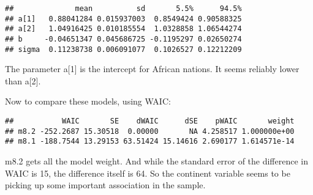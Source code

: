 \documentclass[
]{article}
\newenvironment{Shaded}{\begin{snugshade}}{\end{snugshade}}
\newcommand{\CommentTok}[1]{\textcolor[rgb]{0.56,0.35,0.01}{\textit{#1}}}
\newcommand{\DataTypeTok}[1]{\textcolor[rgb]{0.13,0.29,0.53}{#1}}
\newcommand{\DecValTok}[1]{\textcolor[rgb]{0.00,0.00,0.81}{#1}}
\newcommand{\FloatTok}[1]{\textcolor[rgb]{0.00,0.00,0.81}{#1}}
\newcommand{\KeywordTok}[1]{\textcolor[rgb]{0.13,0.29,0.53}{\textbf{#1}}}
\newcommand{\NormalTok}[1]{#1}
\newcommand{\OperatorTok}[1]{\textcolor[rgb]{0.81,0.36,0.00}{\textbf{#1}}}
\newcommand{\StringTok}[1]{\textcolor[rgb]{0.31,0.60,0.02}{#1}}
\begin{document}
\begin{Shaded}
\end{Shaded}

\begin{verbatim}
##              mean          sd       5.5%      94.5%
## a[1]   0.88041284 0.015937003  0.8549424 0.90588325
## a[2]   1.04916425 0.010185554  1.0328858 1.06544274
## b     -0.04651347 0.045686725 -0.1195297 0.02650274
## sigma  0.11238738 0.006091077  0.1026527 0.12212209
\end{verbatim}

The parameter a{[}1{]} is the intercept for African nations. It seems
reliably lower than a{[}2{]}.

Now to compare these models, using WAIC:

\begin{verbatim}
##           WAIC       SE    dWAIC      dSE    pWAIC       weight
## m8.2 -252.2687 15.30518  0.00000       NA 4.258517 1.000000e+00
## m8.1 -188.7544 13.29153 63.51424 15.14616 2.690177 1.614571e-14
\end{verbatim}

m8.2 gets all the model weight. And while the standard error of the
difference in WAIC is 15, the difference itself is 64. So the continent
variable seems to be picking up some important association in the
sample.
\end{document}

